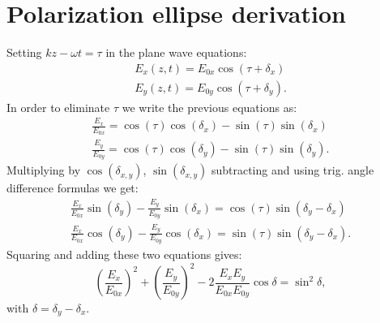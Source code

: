 \section{Polarization ellipse derivation}
\label{sec:deriv_pol_ellipse}
Setting $kz-\omega t=\tau$ in the plane wave equations:
\begin{equation}
\begin{aligned}
    E_x(z, t) = E_{0x}\cos(\tau + \delta_x) \\
    E_y(z, t) = E_{0y}\cos(\tau + \delta_y).
\end{aligned}
\end{equation}
In order to eliminate $\tau$ we write the previous equations as:
\begin{equation}
\begin{aligned}
    \frac{E_x}{E_{0x}} = \cos(\tau)\cos(\delta_x) - \sin(\tau)\sin(\delta_x)\\
    \frac{E_y}{E_{0y}} = \cos(\tau)\cos(\delta_y) - \sin(\tau)\sin(\delta_y).
\end{aligned}
\end{equation}
Multiplying by $\cos(\delta_{x,y})$, $\sin(\delta_{x,y})$ subtracting and using trig. angle difference formulas we get:
\begin{equation}
\begin{aligned}
    \frac{E_x}{E_{0x}}\sin(\delta_y) - \frac{E_y}{E_{0y}}\sin(\delta_x) = \cos(\tau)\sin(\delta_y-\delta_x)\\
    \frac{E_x}{E_{0x}}\cos(\delta_y) - \frac{E_y}{E_{0y}}\cos(\delta_x) = \sin(\tau)\sin(\delta_y-\delta_x).
\end{aligned}
\end{equation}
Squaring and adding these two equations gives:
\begin{equation}
    \left(\frac{E_x}{E_{0x}}\right)^2+\left(\frac{E_y}{E_{0y}}\right)^2-2\frac{E_x E_y}{E_{0x} E_{0y}}\cos \delta =\sin^2 \delta,
\end{equation}
with $\delta=\delta_y-\delta_x$.


